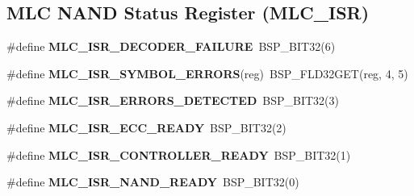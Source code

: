 \subsection*{M\+LC N\+A\+ND Status Register (M\+L\+C\+\_\+\+I\+SR)}
\begin{DoxyCompactItemize}
\item 
\mbox{\label{group__lpc32xx__nand__mlc_gae29aed53319b4d98465135a88afef240}} 
\#define {\bfseries M\+L\+C\+\_\+\+I\+S\+R\+\_\+\+D\+E\+C\+O\+D\+E\+R\+\_\+\+F\+A\+I\+L\+U\+RE}~B\+S\+P\+\_\+\+B\+I\+T32(6)
\item 
\mbox{\label{group__lpc32xx__nand__mlc_ga3786ba72db48f949799ce65eada46a60}} 
\#define {\bfseries M\+L\+C\+\_\+\+I\+S\+R\+\_\+\+S\+Y\+M\+B\+O\+L\+\_\+\+E\+R\+R\+O\+RS}(reg)~B\+S\+P\+\_\+\+F\+L\+D32\+G\+ET(reg, 4, 5)
\item 
\mbox{\label{group__lpc32xx__nand__mlc_ga663a5bee36ff30d782a8dbb22486a795}} 
\#define {\bfseries M\+L\+C\+\_\+\+I\+S\+R\+\_\+\+E\+R\+R\+O\+R\+S\+\_\+\+D\+E\+T\+E\+C\+T\+ED}~B\+S\+P\+\_\+\+B\+I\+T32(3)
\item 
\mbox{\label{group__lpc32xx__nand__mlc_ga6227e8a75d00dc03f541bfef662043b7}} 
\#define {\bfseries M\+L\+C\+\_\+\+I\+S\+R\+\_\+\+E\+C\+C\+\_\+\+R\+E\+A\+DY}~B\+S\+P\+\_\+\+B\+I\+T32(2)
\item 
\mbox{\label{group__lpc32xx__nand__mlc_ga7243c69a7b2dd87d8765e67fae3c26b0}} 
\#define {\bfseries M\+L\+C\+\_\+\+I\+S\+R\+\_\+\+C\+O\+N\+T\+R\+O\+L\+L\+E\+R\+\_\+\+R\+E\+A\+DY}~B\+S\+P\+\_\+\+B\+I\+T32(1)
\item 
\mbox{\label{group__lpc32xx__nand__mlc_ga05f0ffd018f9047cd2e897cbb98d4c10}} 
\#define {\bfseries M\+L\+C\+\_\+\+I\+S\+R\+\_\+\+N\+A\+N\+D\+\_\+\+R\+E\+A\+DY}~B\+S\+P\+\_\+\+B\+I\+T32(0)
\end{DoxyCompactItemize}
